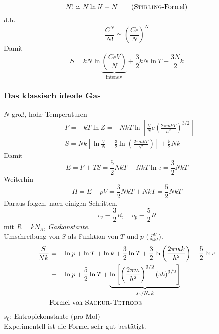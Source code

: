 \begin{enumerate}[i)]
    \begin{equation}
        N! \simeq N \ln N - N \qquad \text{(\textsc{Stirling}-Formel)}
    \end{equation}
    d.h.
    \begin{equation}
        \frac{C^N}{N!} \simeq \left( \frac{C e}{N} \right)^N
    \end{equation}
    Damit
    \begin{equation}
        S = k N \ln \underbrace{\left( \frac{C e V}{N} \right)}_{\text{intensiv}} + \frac{3}{2} k N \ln T + \frac{3 N}{2} k
    \end{equation}
\end{enumerate}

\subsubsection{Das klassisch ideale Gas}
$N$ groß, hohe Temperaturen
\begin{equation}
    \begin{split}
        & F = - k T \ln Z = - N k T \ln \left[ \frac{V}{N} e \left( \frac{2 \pi m k T}{h^2} \right)^{3/2} \right] \\
        & S = N k \left[ \ln \frac{V}{N} + \frac{3}{2} \ln \left( \frac{2 \pi m k T}{h^2} \right)  \right] + \frac{5}{2} N k
    \end{split}
\end{equation}
Damit
\begin{equation}
    E = F + TS = \frac{5}{2} N k T - N k T \ln e = \frac{3}{2} N k T
\end{equation}
Weiterhin
\begin{equation}
    H = E + pV = \frac{3}{2} N k T + N k T = \frac{5}{2} N k T
\end{equation}
Daraus folgen, nach einigen Schritten,
\begin{equation}
    c_v = \frac{3}{2} R , \quad c_p = \frac{5}{2} R
\end{equation}
mit $R=kN_A$, \emph{Gaskonstante}. \\
Umschreibung von $S$ als Funktion von $T$ und $p$ ($\frac{p V}{N k T}$).
\begin{equation}
    \begin{split}
        \frac{S}{Nk} &= - \ln p + \ln T + \ln k + \frac{3}{2} \ln T + \frac{3}{2} \ln \left( \frac{2 \pi m k}{h^2} \right) + \frac{5}{2} \ln e \\
        &= - \ln p + \frac{5}{2} \ln T + \underbrace{\ln \left[ \left( \frac{2 \pi m}{h^2} \right)^{3/2} \left( e k \right)^{3/2} \right]}_{s_0/N_a k} \\
        & \text{Formel von \textsc{Sackur-Tetrode}}
    \end{split}
\end{equation}
$s_0$: Entropiekonstante (pro Mol)\\
Experimentell ist die Formel sehr gut bestätigt.
